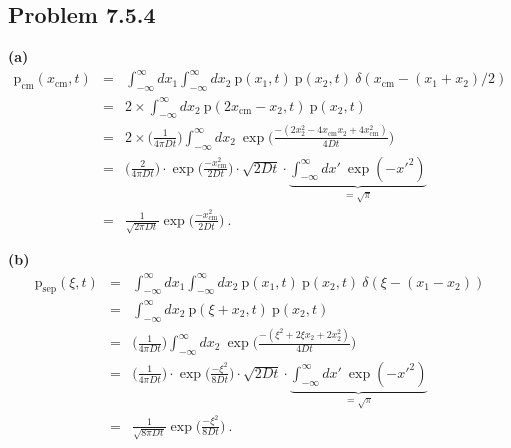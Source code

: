 \subsection{Problem 7.5.4}
\textbf{(a)}
\begin{eqnarray}
\text{p}_\text{cm}(x_\text{cm}, t) &=& \int_{-\infty}^{\infty} dx_1  \int_{-\infty}^{\infty} dx_2 ~ \text{p}(x_1, t)~\text{p}(x_2, t)~\delta(x_\text{cm} - (x_1 + x_2)/2) \nonumber \\
&=& 2 \times \int_{-\infty}^{\infty} dx_2 ~ \text{p}(2 x_\text{cm} - x_2, t)~\text{p}(x_2, t) \nonumber \\
&=& 2 \times \bigg(\frac{1}{4 \pi D t}\bigg) \int_{-\infty}^{\infty} dx_2 ~ \exp\bigg( \frac{-(2 x_2^2 - 4 x_\text{cm} x_2 + 4 x_\text{cm}^2)}{4 D t}
\bigg) \nonumber \\
&=& \bigg(\frac{2}{4 \pi D t}\bigg) \cdot \exp\bigg( \frac{-x_\text{cm}^2}{2 D t}\bigg) \cdot \sqrt{2 D t} \cdot \underbrace{\int_{-\infty}^{\infty} dx' ~ \exp(-x'^2)}_{=\sqrt{\pi}} \nonumber \\
&=& \boxed{\frac{1}{\sqrt{2 \pi D t}} \exp\bigg( \frac{-x_\text{cm}^2}{2 D t}\bigg)}~.
\end{eqnarray}

\textbf{(b)}
\begin{eqnarray}
\text{p}_\text{sep}(\xi, t) &=& \int_{-\infty}^{\infty} dx_1  \int_{-\infty}^{\infty} dx_2 ~ \text{p}(x_1, t)~\text{p}(x_2, t)~\delta(\xi - (x_1 - x_2)) \nonumber \\
&=& \int_{-\infty}^{\infty} dx_2 ~ \text{p}(\xi + x_2, t)~\text{p}(x_2, t) \nonumber \\
&=& \bigg(\frac{1}{4 \pi D t}\bigg) \int_{-\infty}^{\infty} dx_2 ~ \exp\bigg( \frac{-(\xi^2 + 2 \xi x_2 + 2 x_2^2)}{4 D t}
\bigg) \nonumber \\
&=& \bigg(\frac{1}{4 \pi D t}\bigg) \cdot \exp\bigg( \frac{-\xi^2}{8 D t}\bigg) \cdot \sqrt{2 D t} \cdot \underbrace{\int_{-\infty}^{\infty} dx' ~ \exp(-x'^2)}_{=\sqrt{\pi}} \nonumber \\
&=& \boxed{\frac{1}{\sqrt{8 \pi D t}} \exp\bigg( \frac{-\xi^2}{8 D t}\bigg)}~.
\end{eqnarray}

